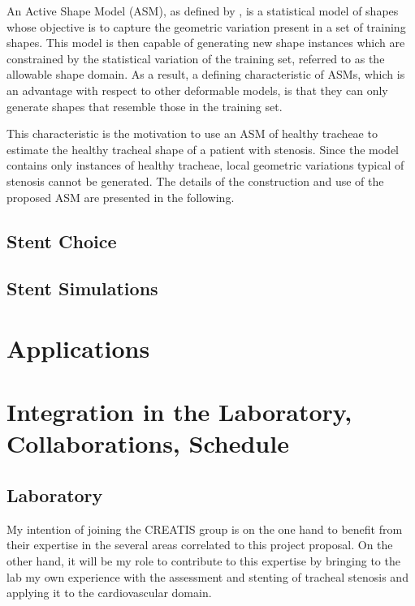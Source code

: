 \documentclass[a4paper]{article}
\begin{document}
An Active Shape Model (ASM), as defined by \citet{Cootes}, is
a statistical model of shapes whose objective is to capture the geometric
variation present in a set of training shapes. This model is then capable
of generating new shape instances which are constrained by the statistical
variation of the training set, referred to as the allowable shape domain.
As a result, a defining characteristic of ASMs, which is an advantage with
respect to other deformable models, is that they can only generate shapes
that resemble those in the training set.

This characteristic is the motivation to use an ASM of healthy tracheae
to estimate the healthy tracheal shape of a patient with stenosis. Since the
model contains only instances of healthy tracheae, local geometric variations
typical of stenosis cannot be generated. The details of the construction and
use of the proposed ASM are presented in the following.

\subsection{Stent Choice}

\subsection{Stent Simulations}

\citep{deBeule}


\section{Applications}

\section{Integration in the Laboratory, Collaborations, Schedule}

\subsection{Laboratory}

My intention of joining the CREATIS group is on the one hand to benefit from their expertise in the several areas correlated to this project proposal. On the other hand, it will be my role to contribute to this expertise by bringing to the lab my own experience with the assessment and stenting of tracheal stenosis and applying it to the cardiovascular domain.
\end{document}

